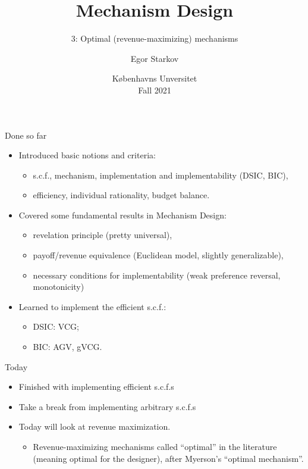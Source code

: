 \documentclass[english,10pt
,aspectratio=169
]{beamer}
\title{Mechanism Design}
\subtitle{3: Optimal (revenue-maximizing) mechanisms}
\author{Egor Starkov}
\date{K{\o}benhavns Unversitet \\
	Fall 2021}
\begin{document}
	\frame[plain]{\titlepage}



\begin{frame}{Done so far}
\begin{itemize}
	\item Introduced basic notions and criteria:
	\begin{itemize}
		\item s.c.f., mechanism, implementation and implementability (DSIC, BIC),
		\item efficiency, individual rationality, budget balance.
	\end{itemize}
	\pause
	\item Covered some fundamental results in Mechanism Design:
	\begin{itemize}
		\item revelation principle (pretty universal),
		\item payoff/revenue equivalence (Euclidean model, slightly generalizable),
		\item necessary conditions for implementability (weak preference reversal, monotonicity)
	\end{itemize}
	\pause
	\item Learned to implement the efficient s.c.f.:
	\begin{itemize}
		\item DSIC: VCG;
		\item BIC: AGV, gVCG.
	\end{itemize}
\end{itemize}
\end{frame}


\begin{frame}{Today}
\begin{itemize}
	\item Finished with implementing efficient s.c.f.s
	\item Take a break from implementing arbitrary s.c.f.s
	\item Today will look at revenue maximization.
	\begin{itemize}
		\item Revenue-maximizing mechanisms called ``optimal'' in the literature (meaning optimal for the designer), after Myerson's ``optimal mechanism''.
	\end{itemize}
\end{itemize}
\end{frame}
\end{document}
